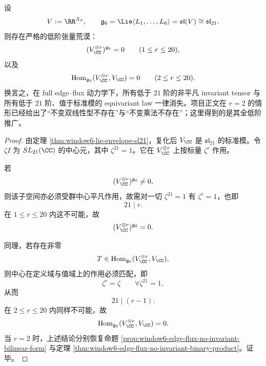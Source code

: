 \begin{theorem}\label{thm:conclusion-window6-low-order-tensor-vacuum}
设
\[
V:=\RR^{X_6},
\qquad
\mathfrak g_6=\Lie\langle L_1,\dots,L_6\rangle=\mathfrak{sl}(V)\cong \mathfrak{sl}_{21}.
\]
则存在严格的低阶张量荒漠：
\[
(V_{\CC}^{\otimes r})^{\mathfrak g_6}=0
\qquad
(1\le r\le 20),
\]
以及
\[
\operatorname{Hom}_{\mathfrak g_6}(V_{\CC}^{\otimes r},V_{\CC})=0
\qquad
(2\le r\le 20).
\]
换言之，在 full edge--flux 动力学下，所有低于 \(21\) 阶的非平凡 invariant tensor 与所有低于 \(21\) 阶、值于标准模的 equivariant law 一律消失。项目正文在 \(r=2\) 的情形已经给出了“不变双线性型不存在”与“不变乘法不存在”；这里得到的是其全低阶推广。
\end{theorem}
\begin{proof}
由定理 \ref{thm:window6-lie-envelope-sl21}，复化后 \(V_{\CC}\) 是 \(\mathfrak{sl}_{21}\) 的标准模。令 \(\zeta I\) 为 \(SL_{21}(\CC)\) 的中心元，其中 \(\zeta^{21}=1\)。它在 \(V_{\CC}^{\otimes r}\) 上按标量 \(\zeta^r\) 作用。

若
\[
(V_{\CC}^{\otimes r})^{\mathfrak g_6}\neq 0,
\]
则该子空间亦必须受群中心平凡作用，故需对一切 \(\zeta^{21}=1\) 有 \(\zeta^r=1\)，也即
\[
21\mid r.
\]
在 \(1\le r\le 20\) 内这不可能，故
\[
(V_{\CC}^{\otimes r})^{\mathfrak g_6}=0.
\]

同理，若存在非零
\[
T\in \operatorname{Hom}_{\mathfrak g_6}(V_{\CC}^{\otimes r},V_{\CC}),
\]
则中心在定义域与值域上的作用必须匹配，即
\[
\zeta^r=\zeta
\qquad
\forall \zeta^{21}=1,
\]
从而
\[
21\mid (r-1).
\]
在 \(2\le r\le 20\) 内同样不可能，故
\[
\operatorname{Hom}_{\mathfrak g_6}(V_{\CC}^{\otimes r},V_{\CC})=0.
\]
当 \(r=2\) 时，上述结论分别恢复命题 \ref{prop:window6-edge-flux-no-invariant-bilinear-form} 与定理 \ref{thm:window6-edge-flux-no-invariant-binary-product}。证毕。
\end{proof}

